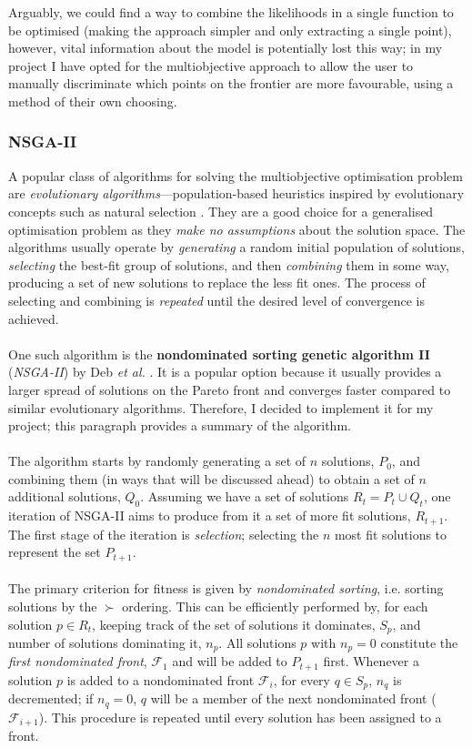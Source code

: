 \documentclass[12pt,a4paper,twoside,openright]{report}
\begin{document}
\noindent Arguably, we could find a way to combine the likelihoods in a single function to be optimised (making the approach simpler and only extracting a single point), however, vital information about the model is potentially lost this way; in my project I have opted for the multiobjective approach to allow the user to manually discriminate which points on the frontier are more favourable, using a method of their own choosing.

\subsubsection{NSGA-II}

A popular class of algorithms for solving the multiobjective optimisation problem are \emph{evolutionary algorithms}---population-based heuristics inspired by evolutionary concepts such as natural selection \cite{back1996evolutionary}. They are a good choice for a generalised optimisation problem as they \emph{make no assumptions} about the solution space. The algorithms usually operate by \emph{generating} a random initial population of solutions, \emph{selecting} the best-fit group of solutions, and then \emph{combining} them in some way, producing a set of new solutions to replace the less fit ones. The process of selecting and combining is \emph{repeated} until the desired level of convergence is achieved.\\ \\
One such algorithm is the \textbf{nondominated sorting genetic algorithm II} (\emph{NSGA-II}) by Deb \emph{et al.} \cite{deb2002fast}. It is a popular option because it usually provides a larger spread of solutions on the Pareto front and converges faster compared to similar evolutionary algorithms. Therefore, I decided to implement it for my project; this paragraph provides a summary of the algorithm.\\ \\
The algorithm starts by randomly generating a set of $n$ solutions, $P_0$, and combining them (in ways that will be discussed ahead) to obtain a set of $n$ additional solutions, $Q_0$. Assuming we have a set of solutions $R_t = P_t \cup Q_t$, one iteration of NSGA-II aims to produce from it a set of more fit solutions, $R_{t+1}$. The first stage of the iteration is \emph{selection}; selecting the $n$ most fit solutions to represent the set $P_{t+1}$.\\ \\
The primary criterion for fitness is given by \emph{nondominated sorting}, i.e.\!\!\! sorting solutions by the $\succ$ ordering. This can be efficiently performed by, for each solution $p \in R_t$, keeping track of the set of solutions it dominates, $S_p$, and number of solutions dominating it, $n_p$. All solutions $p$ with $n_p = 0$ constitute the \emph{first nondominated front}, $\mathcal{F}_1$ and will be added to $P_{t+1}$ first. Whenever a solution $p$ is added to a nondominated front $\mathcal{F}_i$, for every $q \in S_p$, $n_q$ is decremented; if $n_q = 0$, $q$ will be a member of the next nondominated front ($\mathcal{F}_{i+1}$). This procedure is repeated until every solution has been assigned to a front.\\ \\
\end{document}
